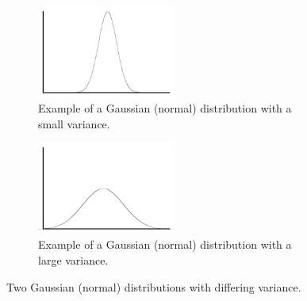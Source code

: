 \DIFdelend \DIFaddbegin \begin{figure}[H]
\DIFaddendFL \centering
\begin{subfigure}[c!]{0.5\textwidth}
\centering
\includegraphics[width=0.5\textwidth]{figure/norm-narrow.png}
\caption{Example of a Gaussian (normal) distribution with a small variance.}\label{fig:norm-narrow}
\end{subfigure}
\qquad
\begin{subfigure}[c!]{0.5\textwidth}
\centering
\includegraphics[width=0.5\textwidth]{figure/norm-wide.png}
\caption{Example of a Gaussian (normal) distribution with a large variance.}\label{fig:norm-wide}
\end{subfigure}
\caption{Two Gaussian (normal) distributions with differing variance.}\label{fig:norm-dist}
\end{figure}


